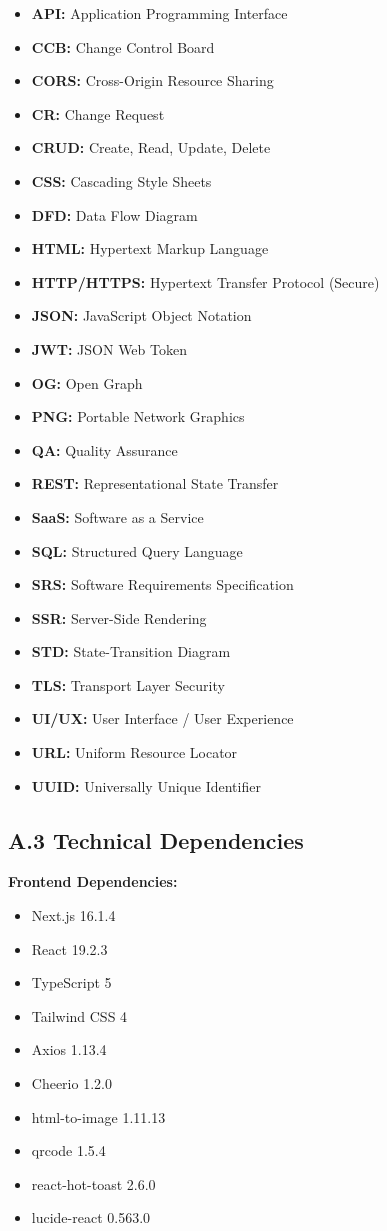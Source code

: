 \documentclass[12pt,a4paper]{article}
\begin{document}
\begin{itemize}
    \item \textbf{API:} Application Programming Interface
    \item \textbf{CCB:} Change Control Board
    \item \textbf{CORS:} Cross-Origin Resource Sharing
    \item \textbf{CR:} Change Request
    \item \textbf{CRUD:} Create, Read, Update, Delete
    \item \textbf{CSS:} Cascading Style Sheets
    \item \textbf{DFD:} Data Flow Diagram
    \item \textbf{HTML:} Hypertext Markup Language
    \item \textbf{HTTP/HTTPS:} Hypertext Transfer Protocol (Secure)
    \item \textbf{JSON:} JavaScript Object Notation
    \item \textbf{JWT:} JSON Web Token
    \item \textbf{OG:} Open Graph
    \item \textbf{PNG:} Portable Network Graphics
    \item \textbf{QA:} Quality Assurance
    \item \textbf{REST:} Representational State Transfer
    \item \textbf{SaaS:} Software as a Service
    \item \textbf{SQL:} Structured Query Language
    \item \textbf{SRS:} Software Requirements Specification
    \item \textbf{SSR:} Server-Side Rendering
    \item \textbf{STD:} State-Transition Diagram
    \item \textbf{TLS:} Transport Layer Security
    \item \textbf{UI/UX:} User Interface / User Experience
    \item \textbf{URL:} Uniform Resource Locator
    \item \textbf{UUID:} Universally Unique Identifier
\end{itemize}

\subsection*{A.3 Technical Dependencies}

\textbf{Frontend Dependencies:}
\begin{itemize}
    \item Next.js 16.1.4
    \item React 19.2.3
    \item TypeScript 5
    \item Tailwind CSS 4
    \item Axios 1.13.4
    \item Cheerio 1.2.0
    \item html-to-image 1.11.13
    \item qrcode 1.5.4
    \item react-hot-toast 2.6.0
    \item lucide-react 0.563.0
\end{itemize}
\end{document}
